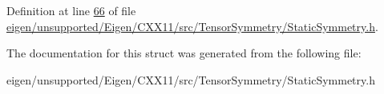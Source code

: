Definition at line \hyperlink{eigen_2unsupported_2_eigen_2_c_x_x11_2src_2_tensor_symmetry_2_static_symmetry_8h_source_l00066}{66} of file \hyperlink{eigen_2unsupported_2_eigen_2_c_x_x11_2src_2_tensor_symmetry_2_static_symmetry_8h_source}{eigen/unsupported/\+Eigen/\+C\+X\+X11/src/\+Tensor\+Symmetry/\+Static\+Symmetry.\+h}.



The documentation for this struct was generated from the following file\+:\begin{DoxyCompactItemize}
\item 
eigen/unsupported/\+Eigen/\+C\+X\+X11/src/\+Tensor\+Symmetry/\+Static\+Symmetry.\+h\end{DoxyCompactItemize}
